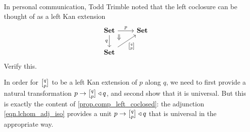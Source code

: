 \documentclass[Book-Poly]{subfiles}
\begin{document}
\begin{exercise}
In personal communication, Todd Trimble noted that the left coclosure can be thought of as a left Kan extension
\[
\begin{tikzcd}
	\smset\ar[r, "p"]\ar[d, "q"']\ar[dr, phantom, very near start, "\Downarrow"]&
	\smset\\
	\smset\ar[ur, "\lchom{q}{p}"']&~
\end{tikzcd}
\]
Verify this.
\end{exercise}
\begin{solution}
In order for $\lchom{q}{p}$ to be a left Kan extension of $p$ along $q$, we need to first provide a natural transformation $p\to \lchom{q}{p}\tri q$, and second show that it is universal. But this is exactly the content of \cref{prop.comp_left_coclosed}: the adjunction \eqref{eqn.lchom_adj_iso} provides a unit $p\to \lchom{q}{p}\tri q$ that is universal in the appropriate way. 
\end{solution}
\end{document}
